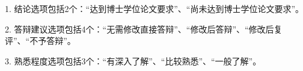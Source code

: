 \begin{reviewinfo}
{1. 结论选项包括2个：“达到博士学位论文要求”、“尚未达到博士学位论文要求”。

2. 答辩建议选项包括4个：“无需修改直接答辩”、“修改后答辩”、“修改后复评”、“不予答辩”。

3. 熟悉程度选项包括3个：“有深入了解”、“比较熟悉”、“一般了解”。
\\

\color{red}{
\noindent 提醒（正式成文后删除）：

1. 评阅版论文删除此页。

2. 采用双盲评阅方式的学位申请人撰写的学位论文删除此页。

3. 评阅总分无需取整。

4. 工作单位填至学校、科研院所即可。

}


}



  
\end{reviewinfo}
